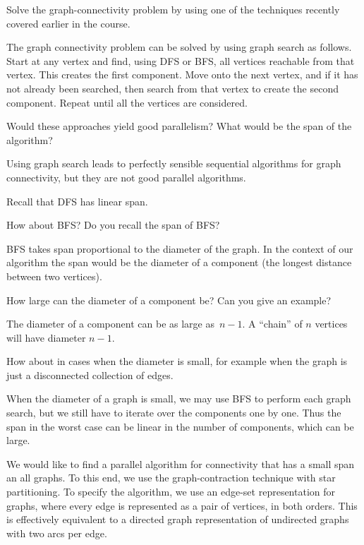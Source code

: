 {\begin{question}
  Solve the graph-connectivity problem by using one of the
  techniques recently covered earlier in the course.
\end{question}
%
The graph connectivity problem can be solved by using graph search as follows. Start at any vertex and find, using DFS or BFS,
all vertices reachable from that vertex. This creates the first
component.  Move onto the next vertex, and if it has not
already been searched, then search from that vertex to create the
second component.  Repeat  until all the vertices are considered.
%
\begin{question}
Would these approaches yield good parallelism?  What would be the
span of the algorithm? 
\end{question}
%
Using graph search leads to perfectly sensible sequential algorithms
for graph connectivity, but they are not good parallel algorithms.
%
\begin{notesonly}
Recall that DFS has linear span.
\begin{question}
How about BFS? Do you  recall the span of BFS? 
\end{question}
BFS takes span proportional to the diameter of the graph.  In the
context of our algorithm the span would be the diameter of a
component (the longest distance between two vertices).
\begin{question}
How large can the diameter of a component be? Can you give an example? 
\end{question}
The diameter of a component can be as large as~$n-1$.  A ``chain'' of
$n$ vertices will have diameter $n-1$.
\begin{question}
How about in cases when the diameter is small, for example when the
graph is just a disconnected collection of edges.
\end{question}
\end{notesonly}
%
When the diameter of a graph is small, we may use BFS to perform each
graph search, but we still have to iterate over the components one by
one.  Thus the span in the worst case can be linear in the number of
components, which can be large.

We would like to find a parallel algorithm for connectivity that has a
small span an all graphs.  To this end, we use the graph-contraction
technique with star partitioning.  
%
To specify the algorithm, we use an edge-set representation for
graphs, where every edge is represented as a pair of vertices, in both
orders.  
%
This is effectively equivalent to a directed graph representation of
undirected graphs with two arcs per edge.

}
